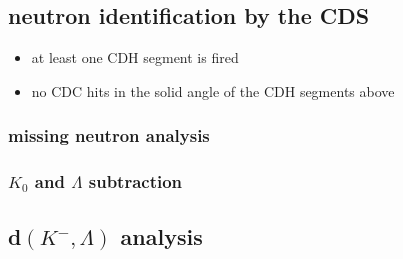 \subsection{neutron identification by the CDS}
\begin{itemize}
\item at least one CDH segment is fired
\item no CDC hits in the solid angle of the CDH segments above

\end{itemize}
\subsubsection{missing neutron analysis}

\subsubsection{$K_0$ and $\Lambda$ subtraction}


\subsection{d$(K^-,\Lambda)$ analysis}
